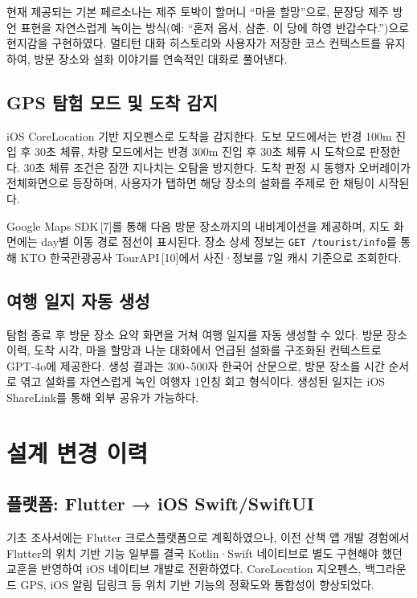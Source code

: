 \documentclass[10pt,twocolumn,a4paper]{article}
\begin{document}
현재 제공되는 기본 페르소나는 제주 토박이 할머니 ``마을 할망''으로,
문장당 제주 방언 표현을 자연스럽게 녹이는 방식(예: ``혼저 옵서, 삼춘.
이 당에 하영 반갑수다.'')으로 현지감을 구현하였다. 멀티턴 대화 히스토리와
사용자가 저장한 코스 컨텍스트를 유지하여, 방문 장소와 설화 이야기를
연속적인 대화로 풀어낸다.

\subsection{GPS 탐험 모드 및 도착 감지}

iOS CoreLocation 기반 지오펜스로 도착을 감지한다. 도보 모드에서는 반경
100m 진입 후 30초 체류, 차량 모드에서는 반경 300m 진입 후 30초 체류 시
도착으로 판정한다. 30초 체류 조건은 잠깐 지나치는 오탐을 방지한다. 도착 판정
시 동행자 오버레이가 전체화면으로 등장하며, 사용자가 탭하면 해당 장소의 설화를
주제로 한 채팅이 시작된다.

Google Maps SDK\,[7]를 통해 다음 방문 장소까지의 내비게이션을 제공하며,
지도 화면에는 day별 이동 경로 점선이 표시된다. 장소 상세 정보는
\texttt{GET /tourist/info}를 통해 KTO 한국관광공사 TourAPI\,[10]에서 사진·정보를
7일 캐시 기준으로 조회한다.

\subsection{여행 일지 자동 생성}

탐험 종료 후 방문 장소 요약 화면을 거쳐 여행 일지를 자동 생성할 수 있다.
방문 장소 이력, 도착 시각, 마을 할망과 나눈 대화에서 언급된 설화를 구조화된
컨텍스트로 GPT-4o에 제공한다. 생성 결과는 300\textasciitilde500자 한국어 산문으로,
방문 장소를 시간 순서로 엮고 설화를 자연스럽게 녹인 여행자 1인칭 회고
형식이다. 생성된 일지는 iOS ShareLink를 통해 외부 공유가 가능하다.

\section{설계 변경 이력}

\subsection{플랫폼: Flutter → iOS Swift/SwiftUI}

기초 조사서에는 Flutter 크로스플랫폼으로 계획하였으나, 이전 산책 앱
개발 경험에서 Flutter의 위치 기반 기능 일부를 결국 Kotlin·Swift 네이티브로
별도 구현해야 했던 교훈을 반영하여 iOS 네이티브 개발로 전환하였다.
CoreLocation 지오펜스, 백그라운드 GPS, iOS 알림 딥링크 등 위치 기반 기능의
정확도와 통합성이 향상되었다.
\end{document}
